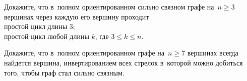 \resetproblem \begingroup %
    \def\jeolmdate{2 июня 2018 г., пара 2}%
    \def\jeolmgroupname{Группа 9-3}%
    \def\jeolmauthors{Афризонов Д., Тихонов~Ю.}%
\jeolmheader \endgroup





\begin{problems}

\item
Докажите, что в~полном ориентированном сильно связном графе на~$n \geq 3$
вершинах через каждую его вершину проходит
\\
\subproblem простой цикл длины $3$;
\\
\subproblem простой цикл любой длины $k$, где $3 \leq k \leq n$.

\item
Докажите, что в~полном ориентированном графе на~$n \geq 7$ вершинах всегда
найдется вершина, инвертированием всех стрелок в~которой можно добиться того,
чтобы граф стал сильно связным.

\end{problems}

